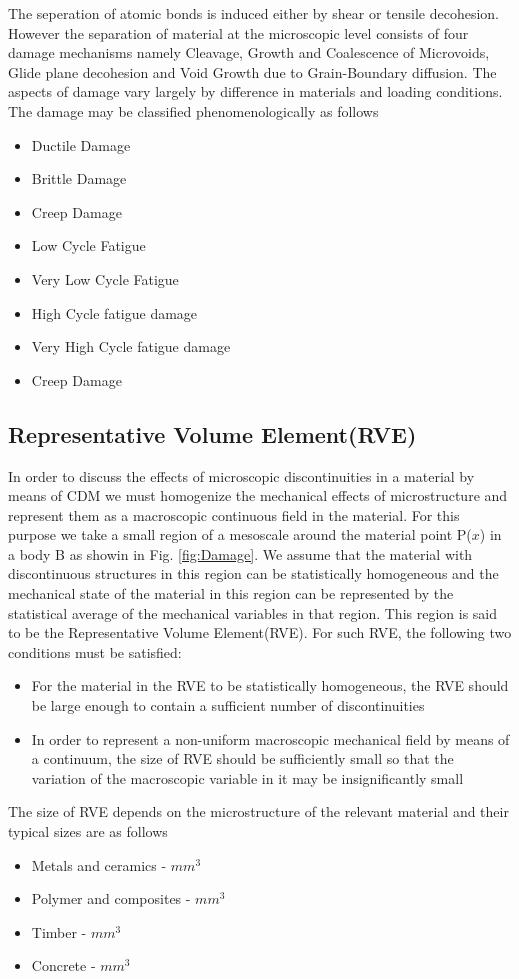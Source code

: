 \documentclass[a4paper,14pt]{extarticle}
\begin{document}
The seperation of atomic bonds is induced either by shear or tensile decohesion. However the separation of material at the microscopic level consists of four damage mechanisms namely Cleavage, Growth and Coalescence of Microvoids, Glide plane decohesion and Void Growth due to Grain-Boundary diffusion.  The aspects of damage vary largely by difference in materials and loading conditions. The damage may be classified phenomenologically as follows
\begin{itemize}
\item Ductile Damage
\item Brittle Damage
\item Creep Damage
\item Low Cycle Fatigue
\item Very Low Cycle Fatigue
\item High Cycle fatigue damage
\item Very High Cycle fatigue damage
\item Creep Damage
\end{itemize}
\subsection{Representative Volume Element(RVE)}
\indent\indent\indent  In order to discuss the effects of microscopic discontinuities in  a material by means of CDM we must homogenize the mechanical effects of microstructure and represent them as a macroscopic continuous field in the material. For this purpose we take a small region of a mesoscale around the material point P($x$) in a body B as showin in Fig. \ref{fig:Damage}. We assume that the  material with discontinuous structures in this region can be statistically homogeneous and the mechanical state of the material in this region can be represented by the statistical average of the mechanical variables in that region. This region is said to be the Representative Volume Element(RVE). For such RVE, the following two conditions must be satisfied:
\begin{itemize}
\item  For the material in the RVE to be statistically homogeneous, the RVE should be large enough to contain a sufficient number of discontinuities
\item In order to represent a non-uniform macroscopic mechanical field by means of a continuum, the size of RVE should be sufficiently small so that the variation of the macroscopic variable in it may be insignificantly small
\end{itemize}
The size of RVE depends on the microstructure of the relevant material and their typical sizes are as follows
\begin{itemize}
\item Metals and ceramics  \;    -    $mm^3$
\item Polymer and composites \;   -   $mm^3$
\item Timber\; - $mm^3$
\item Concrete \; - $mm^3$
\end{itemize}
\end{document}
